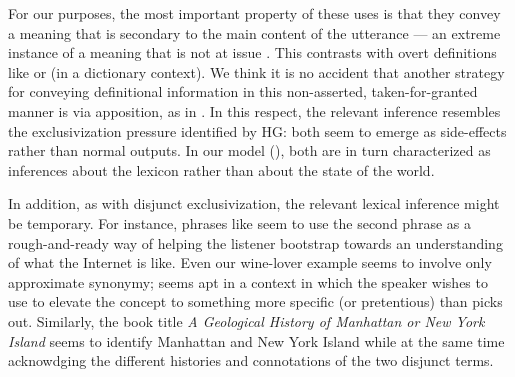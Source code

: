 \documentclass{article}
\begin{document}
For our purposes, the most important property of these uses is that
they convey a meaning that is secondary to the main content of the
utterance --- an extreme instance of a meaning that is not at issue
\citep{Tonhauser-etal:2011}. This contrasts with overt definitions
like  or 
(in a dictionary context).  We think it is no accident that another
strategy for conveying definitional information in this non-asserted,
taken-for-granted manner is via apposition, as in  \citep{Potts05BOOK}. In this respect, the relevant
inference resembles the exclusivization pressure identified by HG:
both seem to emerge as side-effects rather than normal outputs. In our
model (), both are in turn characterized as
inferences about the lexicon rather than about the state of the world.

In addition, as with disjunct exclusivization, the relevant lexical
inference might be temporary. For instance, phrases like
 seem to use the second phrase as a
rough-and-ready way of helping the listener bootstrap towards an
understanding of what the Internet is like. Even our wine-lover
example seems to involve only approximate synonymy;  seems apt in a context in which the speaker wishes to
use  to elevate the concept to something more specific
(or pretentious) than  picks out. Similarly, the book
title \emph{A Geological History of Manhattan or New York Island}
seems to identify Manhattan and New York Island while at the same time
acknowdging the different histories and connotations of the two
disjunct terms.
\end{document}
